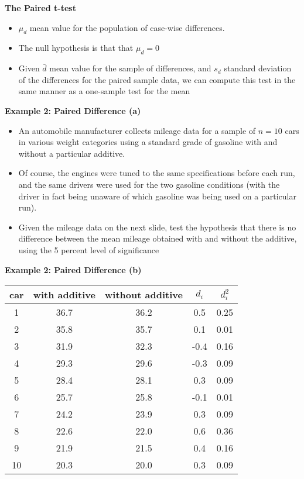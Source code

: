 \documentclass[a4]{beamer}
\begin{document}
{
\noindent \textbf{The Paired t-test}
\begin{itemize}
\item $\mu_d$ mean value for the population of case-wise differences.
\item The null hypothesis is that that $\mu_d = 0$
\item Given $\bar{d}$ mean value for the sample of differences, and $s_d$ standard deviation of the differences for the paired sample data, we can compute this test in the same manner as a one-sample test for the mean
\end{itemize}
}


\noindent \textbf{Example 2: Paired Difference (a)}
\begin{itemize}
\item An automobile manufacturer collects mileage data for a sample of $n = 10$ cars in various weight categories
using a standard grade of gasoline with and without a particular additive. \item Of course, the engines were tuned to the same
specifications before each run, and the same drivers were used for the two gasoline conditions (with the driver in fact being
unaware of which gasoline was being used on a particular run). \item Given the mileage data on the next slide,  test the hypothesis
that there is no difference between the mean mileage obtained with and without the additive, using the 5 percent level of
significance \end{itemize}


\noindent \textbf{Example 2: Paired Difference (b)}
\small
\begin{center}
\begin{tabular}{|c|c|c|c|c|}\hline
car & with additive & without additive & $d_i$ & $d^2_i$\\\hline
1&36.7&36.2&0.5&0.25\\\hline
2&35.8&35.7&0.1&0.01\\\hline
3&31.9&32.3&-0.4&0.16\\\hline
4&29.3&29.6&-0.3&0.09\\\hline
5&28.4&28.1&0.3&0.09\\\hline
6&25.7&25.8&-0.1&0.01\\\hline
7&24.2&23.9&0.3&0.09\\\hline
8&22.6&22.0&0.6&0.36\\\hline
9&21.9&21.5&0.4&0.16\\\hline
10&20.3&20.0&0.3&0.09\\\hline
\end{tabular}
\end{center}
\end{document}
